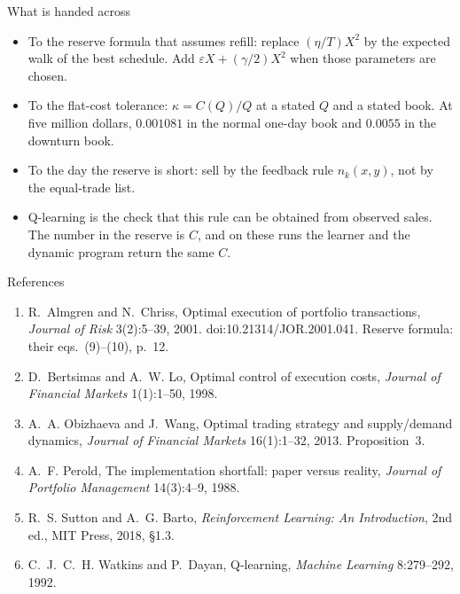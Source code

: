 \documentclass[aspectratio=169,10pt]{beamer}
\newcommand{\currentsource}{}
\newcommand{\framesource}[1]{\gdef\currentsource{#1}}
\newcommand{\aiassisted}{AI assisted, via Grok 4.7}
\begin{document}
\begin{frame}{What is handed across}
\framesource{\aiassisted}
\begin{itemize}
\item To the reserve formula that assumes refill: replace \((\eta/T)X^{2}\) by the expected walk of the best schedule. Add \(\varepsilon X+(\gamma/2)X^{2}\) when those parameters are chosen.
\item To the flat-cost tolerance: \(\kappa=C(Q)/Q\) at a stated \(Q\) and a stated book. At five million dollars, \(0.001081\) in the normal one-day book and \(0.0055\) in the downturn book.
\item To the day the reserve is short: sell by the feedback rule \(n_k(x,y)\), not by the equal-trade list.
\item Q-learning is the check that this rule can be obtained from observed sales. The number in the reserve is \(C\), and on these runs the learner and the dynamic program return the same \(C\).
\end{itemize}
\end{frame}

\begin{frame}{References}
\framesource{}
\footnotesize
\begin{enumerate}
\item R.~Almgren and N.~Chriss, Optimal execution of portfolio transactions, \emph{Journal of Risk} 3(2):5--39, 2001. doi:10.21314/JOR.2001.041. Reserve formula: their eqs.~(9)--(10), p.~12.
\item D.~Bertsimas and A.~W. Lo, Optimal control of execution costs, \emph{Journal of Financial Markets} 1(1):1--50, 1998.
\item A.~A. Obizhaeva and J.~Wang, Optimal trading strategy and supply/demand dynamics, \emph{Journal of Financial Markets} 16(1):1--32, 2013. Proposition~3.
\item A.~F. Perold, The implementation shortfall: paper versus reality, \emph{Journal of Portfolio Management} 14(3):4--9, 1988.
\item R.~S. Sutton and A.~G. Barto, \emph{Reinforcement Learning: An Introduction}, 2nd ed., MIT Press, 2018, \S 1.3.
\item C.~J.~C.~H. Watkins and P.~Dayan, Q-learning, \emph{Machine Learning} 8:279--292, 1992.
\end{enumerate}
\end{frame}
\end{document}
